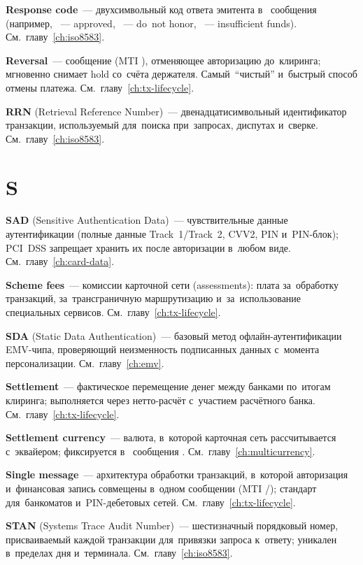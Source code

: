 \textbf{Response code}~--- двухсимвольный код ответа эмитента
в~ сообщения  (например, ~--- approved,
~--- do~not honor, ~--- insufficient
funds). См.~главу~\ref{ch:iso8583}.

\textbf{Reversal}~--- сообщение (MTI ), отменяющее
авторизацию до~клиринга; мгновенно снимает hold со~счёта
держателя. Самый~\enquote{чистый} и~быстрый способ отмены
платежа. См.~главу~\ref{ch:tx-lifecycle}.

\textbf{RRN} (Retrieval Reference Number)~---
двенадцатисимвольный идентификатор транзакции, используемый
для~поиска при~запросах, диспутах
и~сверке. См.~главу~\ref{ch:iso8583}.


\section*{S}

\textbf{SAD} (Sensitive Authentication Data)~--- чувствительные
данные аутентификации (полные данные Track~1/Track~2, CVV2, PIN
и~PIN-блок); PCI~DSS запрещает хранить их после авторизации
в~любом виде. См.~главу~\ref{ch:card-data}.

\textbf{Scheme fees}~--- комиссии карточной сети (assessments):
плата за~обработку транзакций, за~трансграничную маршрутизацию
и~за~использование специальных
сервисов. См.~главу~\ref{ch:tx-lifecycle}.

\textbf{SDA} (Static Data Authentication)~--- базовый метод
офлайн-аутентификации EMV-чипа, проверяющий неизменность
подписанных данных с~момента
персонализации. См.~главу~\ref{ch:emv}.

\textbf{Settlement}~--- фактическое перемещение денег между
банками по~итогам клиринга; выполняется через нетто-расчёт
с~участием расчётного
банка. См.~главу~\ref{ch:tx-lifecycle}.

\textbf{Settlement currency}~--- валюта, в~которой карточная
сеть рассчитывается с~эквайером; фиксируется в~
сообщения . См.~главу~\ref{ch:multicurrency}.

\textbf{Single message}~--- архитектура обработки транзакций,
в~которой авторизация и~финансовая запись совмещены в~одном
сообщении (MTI /); стандарт для~банкоматов
и~PIN-дебетовых сетей. См.~главу~\ref{ch:tx-lifecycle}.

\textbf{STAN} (Systems Trace Audit Number)~--- шестизначный
порядковый номер, присваиваемый каждой транзакции для~привязки
запроса к~ответу; уникален в~пределах дня
и~терминала. См.~главу~\ref{ch:iso8583}.


